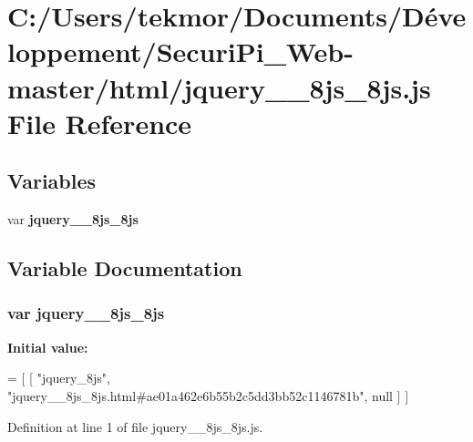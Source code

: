 \section{C\+:/\+Users/tekmor/\+Documents/\+Développement/\+Securi\+Pi\+\_\+\+Web-\/master/html/jquery\+\_\+\+\_\+8js\+\_\+8js.js File Reference}
\label{jquery____8js__8js_8js}
\subsection*{Variables}
\begin{DoxyCompactItemize}
\item 
var {\bf jquery\+\_\+\+\_\+8js\+\_\+8js}
\end{DoxyCompactItemize}


\subsection{Variable Documentation}
\subsubsection[{jquery\+\_\+\+\_\+8js\+\_\+8js}]{\setlength{\rightskip}{0pt plus 5cm}var jquery\+\_\+\+\_\+8js\+\_\+8js}\label{jquery____8js__8js_8js_afbb66394791ce760a204100e85b557c6}
{\bfseries Initial value\+:}
\begin{DoxyCode}
=
[
    [ \textcolor{stringliteral}{"jquery\_8js"}, \textcolor{stringliteral}{"jquery\_\_8js\_8js.html#ae01a462e6b55b2c5dd3bb52c1146781b"}, null ]
]
\end{DoxyCode}


Definition at line 1 of file jquery\+\_\+\+\_\+8js\+\_\+8js.\+js.

